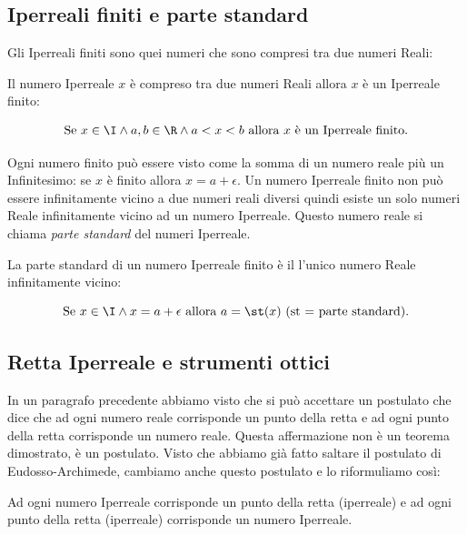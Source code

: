 \subsection{Iperreali finiti e parte standard}
\label{subsec:insnum_partestandard}

Gli Iperreali finiti sono quei numeri che sono compresi tra due numeri Reali:

\begin{definizione}
 Il numero Iperreale $x$ è compreso tra due numeri Reali allora $x$ è un 
Iperreale finito:

\[\text{Se } x \in \I \wedge a, b \in \R \wedge 
  a < x < b \text{ allora } x \text{ è un Iperreale finito.}\]
\end{definizione}

Ogni numero finito può essere visto come la somma di un numero reale più un 
Infinitesimo: se $x$ è finito allora $x = a + \epsilon$. Un numero Iperreale 
finito non può essere infinitamente vicino a due numeri reali diversi quindi 
esiste un solo numeri Reale infinitamente vicino ad un numero Iperreale. 
Questo numero reale si chiama \emph{parte standard} del numeri Iperreale.

\begin{definizione}
 La parte standard di un numero Iperreale finito è il l'unico numero Reale 
infinitamente vicino:

\[\text{Se } x \in \I \wedge x= a+\epsilon \text{ allora } 
a= \st(x) \text{ (st = parte standard).}\]
\end{definizione}


\subsection{Retta Iperreale e strumenti ottici}
\label{subsec:insnum_retta}

In un paragrafo precedente abbiamo visto che si può accettare un postulato che 
dice che ad ogni numero reale corrisponde un punto della retta e ad ogni 
punto della retta corrisponde un numero reale. 
Questa affermazione non è un teorema dimostrato, è un postulato. Visto che 
abbiamo già fatto saltare il postulato di Eudosso-Archimede, cambiamo anche 
questo postulato e lo riformuliamo così:

\begin{postulato}
Ad ogni numero Iperreale corrisponde un punto della retta (iperreale) e ad ogni 
punto della retta (iperreale) corrisponde un numero Iperreale.
\end{postulato}


